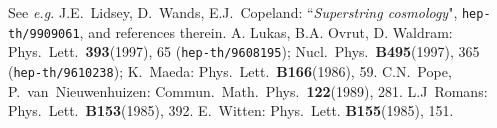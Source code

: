 \documentclass[a4paper,11pt]{article}
\begin{document}
\begin{thebibliography}{1}
%
 See {\em e.g.} J.E.~Lidsey, D.~Wands, E.J.~Copeland:
        ``{\em Superstring cosmology}",
        {\tt hep-th/9909061}, and references therein.
%
 A. Lukas, B.A. Ovrut, D. Waldram:
        Phys.~Lett.~{\bf 393}(1997), 65 ({\tt hep-th/9608195});
        Nucl.~Phys.~{\bf B495}(1997), 365 ({\tt hep-th/9610238});
%
 K.~Maeda:
        Phys.~Lett.~{\bf B166}(1986), 59.
%
%
%
 C.N.~Pope, P.~van~Nieuwenhuizen:
       Commun.~Math.~Phys.~{\bf 122}(1989), 281.
%
 L.J~Romans:
        Phys.~Lett.~{\bf B153}(1985), 392.
%
 E.~Witten:
        Phys.~Lett. {\bf B155}(1985), 151.
%
\end{thebibliography}
\end{document}
